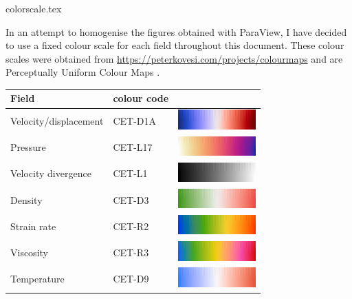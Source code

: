 \begin{flushright} {\tiny {\color{gray} colorscale.tex}} \end{flushright}

In an attempt to homogenise the figures obtained with ParaView, I have decided to use 
a fixed colour scale for each field throughout this document. These colour scales were 
obtained from \url{https://peterkovesi.com/projects/colourmaps} and are 
Perceptually Uniform Colour Maps \cite{kove15}. 

\begin{center}
\begin{tabular}{lll}
\hline
Field & colour code & \\
\hline\hline
Velocity/displacement & CET-D1A & \includegraphics[width=3cm]{images/colourscales/CET-D1A}\\
\hline
Pressure& CET-L17 & \includegraphics[width=3cm]{images/colourscales/CET-L17}\\
\hline
Velocity divergence& CET-L1 & \includegraphics[width=3cm]{images/colourscales/CET-L1}\\
\hline
Density& CET-D3 & \includegraphics[width=3cm]{images/colourscales/CET-D3}\\
\hline
Strain rate& CET-R2 & \includegraphics[width=3cm]{images/colourscales/CET-R2}\\
\hline
Viscosity & CET-R3 & \includegraphics[width=3cm]{images/colourscales/CET-R3}\\
\hline
Temperature & CET-D9 & \includegraphics[width=3cm]{images/colourscales/CET-D9}\\

\end{tabular}
\end{center}
